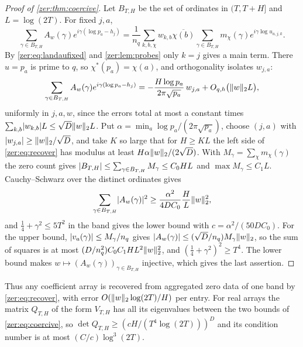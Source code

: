 \begin{proof}[Proof of \cref{zer:thm:coercive}]
Let $B_{T,H}$ be the set of ordinates in $(T,T+H]$ and $L=\log(2T)$. For fixed $j,a$,
\[
 \sum_{\gamma\in B_{T,H}}A_w(\gamma)e^{i\gamma(\log p_a-h_j)}
 =\frac1{n_q}\sum_{k,b,\chi}w_{k,b}\overline{\chi(b)}\sum_{\gamma\in B_{T,H}}
 m_\chi(\gamma)e^{i\gamma\log u_{a,j,k}} .
\]
By \eqref{zer:eq:landaufixed} and \cref{zer:lem:probes} only $k=j$ gives a main term. There
$u=p_a$ is prime to $q$, so $\chi^*(p_a)=\chi(a)$, and orthogonality isolates $w_{j,a}$:
\begin{equation}\label{zer:eq:recover}
 \sum_{\gamma\in B_{T,H}}A_w(\gamma)e^{i\gamma(\log p_a-h_j)}
 =-\frac{H\log p_a}{2\pi\sqrt{p_a}}\,w_{j,a}+O_{q,h}\bigl(\lVert w\rVert_2L\bigr),
\end{equation}
uniformly in $j,a,w$, since the errors total at most a constant times
$\sum_{k,b}\lvert w_{k,b}\rvert L\le\sqrt D\lVert w\rVert_2L$. Put $\alpha=\min_a\log p_a/(2\pi\sqrt{p_a})$,
choose $(j,a)$ with $\lvert w_{j,a}\rvert\ge\lVert w\rVert_2/\sqrt D$, and take $K$ so large that for
$H\ge KL$ the left side of \eqref{zer:eq:recover} has modulus at least
$H\alpha\lVert w\rVert_2/(2\sqrt D)$. With $M_\gamma=\sum_\chi m_\chi(\gamma)$ the zero count gives
$\lvert B_{T,H}\rvert\le\sum_{\gamma\in B_{T,H}}M_\gamma\le C_0HL$ and $\max M_\gamma\le C_1L$.
Cauchy--Schwarz over the distinct ordinates gives
\[
 \sum_{\gamma\in B_{T,H}}\lvert A_w(\gamma)\rvert^2\ge\frac{\alpha^2}{4DC_0}\frac HL\lVert w\rVert_2^2 ,
\]
and $\tfrac14+\gamma^2\le5T^2$ in the band gives the lower bound with $c=\alpha^2/(50DC_0)$. For
the upper bound, $\lvert v_a(\gamma)\rvert\le M_\gamma/n_q$ gives
$\lvert A_w(\gamma)\rvert\le(\sqrt D/n_q)M_\gamma\lVert w\rVert_2$, so the sum of squares is at most
$(D/n_q^2)C_0C_1HL^2\lVert w\rVert_2^2$, and $(\tfrac14+\gamma^2)^2\ge T^4$. The lower bound makes
$w\mapsto(A_w(\gamma))_{\gamma\in B_{T,H}}$ injective, which gives the last assertion.
\end{proof}

Thus any coefficient array is recovered from aggregated zero data of one band by
\eqref{zer:eq:recover}, with error $O(\lVert w\rVert_2\log(2T)/H)$ per entry. For real arrays the
matrix $Q_{T,H}$ of the form $V_{T,H}$ has all its eigenvalues between the two bounds of
\eqref{zer:eq:coercive}, so $\det Q_{T,H}\ge(cH/(T^4\log(2T)))^D$ and its condition number is
at most $(C/c)\log^3(2T)$.

